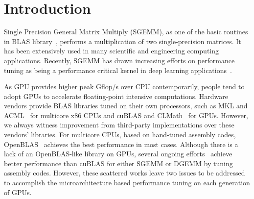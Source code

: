 \section{Introduction}
Single Precision General Matrix Multiply (SGEMM), as one 
of the basic routines in BLAS library~\cite{blas}, performs a multiplication of two single-precision matrices. 
It has been extensively used in many scientific and engineering 
computing applications. 
Recently, SGEMM has drawn increasing efforts on performance tuning as being a performance 
critical kernel in deep learning applications~\cite{chetlur2014cudnn,nervana_sgemm_wiki}.

As GPU provides higher peak Gflop/s over CPU contemporarily, people tend to adopt GPUs to accelerate
floating-point intensive computations. %
Hardware vendors provide BLAS libraries tuned on their own processors, such as MKL and ACML~\cite{intel2007intel,amd2014} for multicore 
x86 CPUs and cuBLAS and CLMath~\cite{nvidia2008cublas, clmath} for
GPUs. However, we always witness improvement from third-party implementations over these vendors' libraries. For
multicore CPUs, based on hand-tuned assembly codes, OpenBLAS~\cite{xianyi2012openblas} achieves the best performance in 
most cases.
Although there is a lack of an OpenBLAS-like library on GPUs, several ongoing efforts~\cite{tan,lai,nervana_sgemm_wiki,
chien, volkov} achieve better performance than cuBLAS for either SGEMM or DGEMM by tuning assembly codes. However, 
these scattered works leave two issues to be addressed to accomplish the microarchitecture based performance tuning on 
each generation of GPUs.

